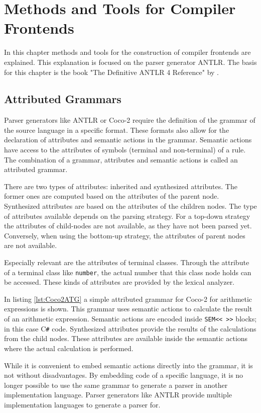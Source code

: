 \chapter{Methods and Tools for Compiler Frontends}

In this chapter  methods and tools for the construction of compiler frontends are explained. This explanation is focused on the parser generator ANTLR. The basis for this chapter is the book "The Definitive ANTLR 4 Reference" by \textcite{Antlr4Reference}.

\section{Attributed Grammars}

Parser generators like ANTLR or Coco-2 require the definition of the grammar of the source language in a specific format. These formats also allow for the declaration of attributes and semantic actions in the grammar. Semantic actions have access to the attributes of symbols (terminal and non-terminal) of a rule. The combination of a grammar, attributes and semantic actions is called an attributed grammar.  


There are two types of attributes: inherited and synthesized attributes. The former ones are computed based on the attributes of the parent node. Synthesized attributes are based on the attributes of the children nodes.  
The type of attributes available depends on the parsing strategy. For a top-down strategy the attributes of child-nodes are not available, as they have not been parsed yet. Conversely, when using the bottom-up strategy, the attributes of parent nodes are not available. 

Especially relevant are the attributes of terminal classes. Through the attribute of a terminal class like \texttt{number}, the actual number that this class node holds can be accessed. These kinds of attributes are provided by the lexical analyzer. 

In listing \ref{lst:Coco2ATG} a simple attributed grammar for Coco-2 for arithmetic expressions is shown. This grammar uses semantic actions to calculate the result of an arithmetic expression. Semantic actions are encoded inside \lstinline{SEM<< >>} blocks; in this case C\verb|#| code. Synthesized attributes provide the results of the calculations from the child nodes. These attributes are available inside the semantic actions where the actual calculation is performed. 

While it is convenient to embed semantic actions directly into the grammar, it is not without disadvantages. By embedding code of a specific language, it is no longer possible to use the same grammar to generate a parser in another implementation language. Parser generators like ANTLR provide multiple implementation languages to generate a parser for. 

